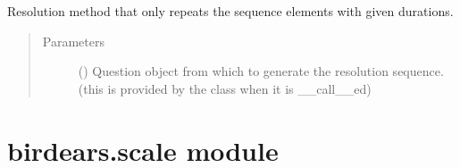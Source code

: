 \documentclass[letterpaper,10pt,english]{sphinxmanual}
\begin{document}

\begin{fulllineitems}
\label{\detokenize{index:birdears.resolution.repeat_only}}
\sphinxAtStartPar
Resolution method that only repeats the sequence elements with given
durations.
\begin{quote}\begin{description}
\item[{Parameters}] \leavevmode
\sphinxAtStartPar
{} () \textendash{} Question object from which to generate the
resolution sequence. (this is provided by the  class
when it is {\color{red}\bfseries{}\textasciigrave{}}\_\_call\_\_\textasciigrave{}ed)

\end{description}\end{quote}

\end{fulllineitems}



\section{birdears.scale module}
\label{\detokenize{index:module-birdears.scale}}\label{\detokenize{index:birdears-scale-module}}
\end{document}
